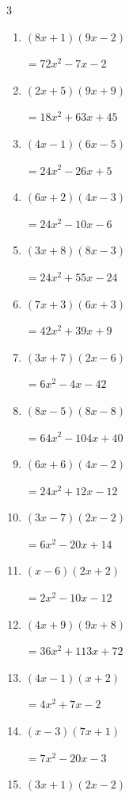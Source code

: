\begin{multicols}{3}
\begin{enumerate}
        $=2x^{2}+7x+5$

\columnbreak %

  \item $(8x+1)(9x-2)$

        $=72x^{2}-7x-2$

  \item $(2x+5)(9x+9)$

        $=18x^{2}+63x+45$

  \item $(4x-1)(6x-5)$

        $=24x^{2}-26x+5$

  \item $(6x+2)(4x-3)$

        $=24x^{2}-10x-6$

  \item $(3x+8)(8x-3)$

        $=24x^{2}+55x-24$

  \item $(7x+3)(6x+3)$

        $=42x^{2}+39x+9$

  \item $(3x+7)(2x-6)$

        $=6x^{2}-4x-42$

  \item $(8x-5)(8x-8)$

        $=64x^{2}-104x+40$

  \item $(6x+6)(4x-2)$

        $=24x^{2}+12x-12$

  \item $(3x-7)(2x-2)$

        $=6x^{2}-20x+14$

  \item $(x-6)(2x+2)$

        $=2x^{2}-10x-12$

  \item $(4x+9)(9x+8)$

        $=36x^{2}+113x+72$

  \item $(4x-1)(x+2)$

        $=4x^{2}+7x-2$

  \item $(x-3)(7x+1)$

        $=7x^{2}-20x-3$

  \item $(3x+1)(2x-2)$


\end{enumerate}
\end{multicols}
